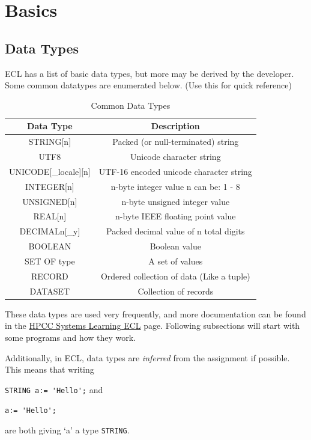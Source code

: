 \chapter{Basics}

\section{Data Types}

ECL has a list of basic data types, but more may be derived by the developer.
Some common datatypes are enumerated below. (Use this for quick reference)
\begin{table}[h]
\centering
\begin{tabular}{|c|c|}\hline
Data Type & Description \\\hline\hline
STRING[n] & Packed (or null-terminated) string \\
UTF8 & Unicode character string \\
UNICODE[\_locale][n] &  UTF-16 encoded unicode character string \\
INTEGER[n] & n-byte integer value n can be: 1 - 8 \\
UNSIGNED[n] & n-byte unsigned integer value \\
REAL[n] & n-byte IEEE floating point value \\
DECIMAL\textlangle{}n\textrangle{}[\_y] & Packed decimal value of n total digits \\
BOOLEAN & Boolean value \\
SET OF \textlangle{}type\textrangle{} & A set of values\\
RECORD & Ordered collection of data (Like a tuple)\\
DATASET & Collection of records \\\hline
\end{tabular}
\caption{Common Data Types}
\end{table}

These data types are used very frequently, and more documentation can be found in the \href{https://hpccsystems.com/training/documentation/learning-ecl}{HPCC Systems Learning ECL} page. Following subsections will start with some programs and how they work.

Additionally, in ECL, data types are \textit{inferred} from the assignment if possible. This means that writing

\lstinline{STRING a:= 'Hello';} and 

\lstinline{a:= 'Hello';}

\noindent{}are both giving `a' a type \lstinline{STRING}. 

